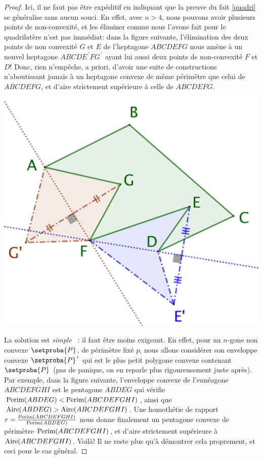 \begin{proof}
	Ici, il ne faut pas être expéditif en indiquant que la preuve du fait \ref{quadri} se généralise sans aucun souci.
	En effet, avec $n > 4$, nous pouvons avoir plusieurs points de non-convexité, et les éliminer comme nous l'avons fait pour le quadrilatère n'est pas immédiat:
	dans la figure suivante, l'élimination des deux points de non convexité $G$ et $E$ de l'heptagone $ABCDEFG$ nous amène à un nouvel heptagone $ABCDE^{\,\prime}FG^{\,\prime}$ ayant lui aussi deux points de non-convexité $F$ et $D$!
	Donc, rien n'empêche, a priori, d'avoir une suite de constructions n'aboutissant jamais à un heptagone convexe de même périmètre que celui de $ABCDEFG$, et d'aire strictement supérieure à celle de $ABCDEFG$.

	\begin{center}
		\includegraphics[scale=.4]{content/polygon/polygon-non-convex-trap.png}
	\end{center}
	

	La solution est \og \emph{simple} \fg\ : il faut être moins exigeant. 
	En effet, pour un $n$-gone non convexe $\setproba{P}$, de périmètre fixé $p$, nous allons considérer son enveloppe convexe $\setproba{P}^{\,\prime}$ qui est le plus petit polygone convexe contenant $\setproba{P}$ (pas de panique, on en reparle plus rigoureusement juste après). 
	Par exemple, dans la figure suivante, l'enveloppe convexe de l'ennéagone $ABCDEFGHI$ est le pentagone $ABDEG$ 
	qui vérifie
	$\mathrm{Perim}(ABDEG) < \mathrm{Perim}(ABCDEFGHI)$, ainsi que
	$\mathrm{Aire}(ABDEG) > \mathrm{Aire}(ABCDEFGHI)$.
	Une homothétie de rapport
	$r = \frac{\mathrm{Perim}(ABCDEFGHI)}{\mathrm{Perim}(ABDEG)}$
	nous donne finalement un pentagone convexe de périmètre $\mathrm{Perim}(ABCDEFGHI)$, et d'aire strictement supérieure à $\mathrm{Aire}(ABCDEFGHI)$.
	Voilà! Il ne reste plus qu'à démontrer cela proprement, et ceci pour le cas général.
	

\end{proof}
